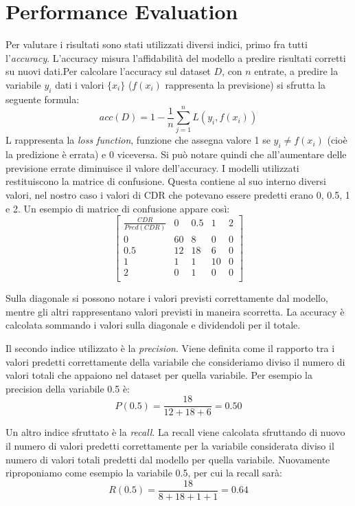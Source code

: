 \section{Performance Evaluation}
Per valutare i risultati sono stati utilizzati diversi indici, primo fra tutti l'\textit{accuracy}. L'accuracy misura l'affidabilità del modello a predire risultati corretti su nuovi dati.Per calcolare l'accuracy sul dataset $D$, con $n$ entrate, a predire la variabile $y_i$ dati i valori $\{x_i\}$ ($f(x_i)$ rappresenta la previsione) si sfrutta la seguente formula:
\[acc(D) = 1 - \frac{1}{n}\sum_{j=1}^{n}L(y_i,f(x_i))\]
L rappresenta la  \textit{loss function}, funzione che assegna valore 1 se $y_i \neq f(x_i)$ (cioè la predizione è errata) e 0 viceversa. Si può notare quindi che all'aumentare delle previsione errate diminuisce il valore dell'accuracy.
I modelli utilizzati restituiscono la matrice di confusione. Questa contiene al suo interno diversi valori, nel nostro caso i valori di CDR che potevano essere predetti erano 0, 0.5, 1 e 2. Un esempio di matrice di confusione appare così:
\[
  \begin{bmatrix}
    \frac{CDR}{Pred(CDR)} & 0 & 0.5 & 1 & 2 \\
    0 & 60 & 8 & 0 & 0 \\
    0.5 & 12 & 18 & 6 & 0 \\
    1 & 1 & 1 & 10 & 0 \\
    2 & 0 & 1 & 0 & 0 \\
  \end{bmatrix}
\]

Sulla diagonale si possono notare i valori previsti correttamente dal modello, mentre gli altri rappresentano valori previsti in maneira scorretta.
La accuracy è calcolata sommando i valori sulla diagonale e dividendoli per il totale. 

Il secondo indice utilizzato è la \textit{precision}. Viene definita come il rapporto tra i valori predetti correttamente della variabile che consideriamo diviso il numero di valori totali che appaiono nel dataset per quella variabile. Per esempio la precision della variabile 0.5 è:
\[P(0.5) = \frac{18}{12+18+6} = 0.50\]

Un altro indice sfruttato è la \textit{recall}. La recall viene calcolata sfruttando di nuovo il numero di valori predetti correttamente per la variabile considerata diviso il numero di valori totali predetti dal modello per quella variabile. Nuovamente riproponiamo come esempio la variabile 0.5, per cui la recall sarà:
\[R(0.5) = \frac{18}{8+18+1+1} = 0.64\]

